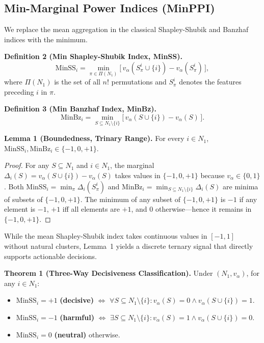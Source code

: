 \documentclass{article} %
\begin{document}
\subsection{Min-Marginal Power Indices (MinPPI)}
\label{sec:minppi}

We replace the mean aggregation in the classical Shapley-Shubik and Banzhaf indices with the minimum.

\textbf{Definition 2 (Min Shapley-Shubik Index, MinSS).}
\begin{equation}
\text{MinSS}_i = \min_{\pi \in \Pi(N_1)} \bigl[\, v_\alpha(S_\pi^i \cup \{i\}) - v_\alpha(S_\pi^i) \,\bigr],
\label{eq:minss}
\end{equation}
where $\Pi(N_1)$ is the set of all $n!$ permutations and $S_\pi^i$ denotes the features preceding $i$ in $\pi$.

\textbf{Definition 3 (Min Banzhaf Index, MinBz).}
\begin{equation}
\text{MinBz}_i = \min_{S \subseteq N_1 \setminus \{i\}} \bigl[\, v_\alpha(S \cup \{i\}) - v_\alpha(S) \,\bigr].
\label{eq:minbz}
\end{equation}

\textbf{Lemma 1 (Boundedness, Trinary Range).}
For every $i \in N_1$, $\text{MinSS}_i, \text{MinBz}_i \in \{-1, 0, +1\}$.

\begin{proof}
For any $S \subseteq N_1$ and $i \in N_1$, the marginal $\Delta_i(S) = v_\alpha(S \cup \{i\}) - v_\alpha(S)$ takes values in $\{-1, 0, +1\}$ because $v_\alpha \in \{0,1\}$. Both $\text{MinSS}_i = \min_{\pi} \Delta_i(S_\pi^i)$ and $\text{MinBz}_i = \min_{S \subseteq N_1 \setminus \{i\}} \Delta_i(S)$ are minima of subsets of $\{-1, 0, +1\}$. The minimum of any subset of $\{-1, 0, +1\}$ is $-1$ if any element is $-1$, $+1$ iff all elements are $+1$, and $0$ otherwise---hence it remains in $\{-1, 0, +1\}$.
\end{proof}

While the mean Shapley-Shubik index takes continuous values in $[-1, 1]$ without natural clusters, Lemma~1 yields a discrete ternary signal that directly supports actionable decisions.

\textbf{Theorem 1 (Three-Way Decisiveness Classification).}
Under $(N_1, v_\alpha)$, for any $i \in N_1$:
\begin{itemize}
\item[(a)] $\text{MinSS}_i = +1$ \textbf{(decisive)} $\iff$ $\forall S \subseteq N_1\setminus\{i\}: v_\alpha(S)=0 \land v_\alpha(S\cup\{i\})=1$.
\item[(b)] $\text{MinSS}_i = -1$ \textbf{(harmful)} $\iff$ $\exists S \subseteq N_1\setminus\{i\}: v_\alpha(S)=1 \land v_\alpha(S\cup\{i\})=0$.
\item[(c)] $\text{MinSS}_i = 0$ \textbf{(neutral)} otherwise.
\end{itemize}
\end{document}
